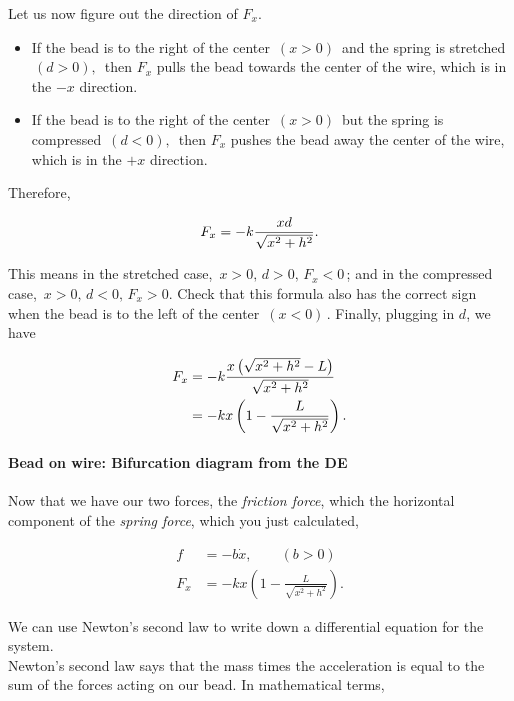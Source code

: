 Let us now figure out the direction of $F_x$.
\begin{itemize}
\item If the bead is to the right of the center $\,(x>0)\,$
  and the spring is stretched $\,(d>0),\,$ then $F_x$ pulls the bead towards the center of the wire,
  which is in the $- x$ direction.
\item If the bead is to the right of the center $\,(x>0)\,$
  but the spring is compressed $\, (d<0),\,$
  then $F_x$ pushes the bead away the center of the wire, which is in the $+ x$ direction.
\end{itemize}

Therefore,

\begin{equation*}
  \displaystyle \displaystyle F_x
  \displaystyle =
  \displaystyle -k\frac{xd}{\sqrt {x^2+h^2}}.
\end{equation*}

This means in the stretched case, $\,x>0,\, d>0,\, F_x < 0\,$;
and in the compressed case, $\,x>0,\, d<0,\, F_x > 0$.
Check that this formula also has the correct sign when the bead is to the left of the center $\,(x<0)\,$.
Finally, plugging in $d$, we have

\begin{align*}
  \displaystyle F_x
  \displaystyle &= \displaystyle - k \frac{x\left(\sqrt {x^2+h^2}-L\right)}{\sqrt {x^2+h^2}} \\
  \displaystyle &= \displaystyle -kx \left(1-\frac{L}{\sqrt {x^2+h^2}}\right).
\end{align*}

\paragraph{Bead on wire: Bifurcation diagram from the DE}
Now that we have our two forces, the \emph{friction force}, which
the horizontal component of the \emph{spring force}, which you just calculated,

\begin{align*}
  f &= -b \dot x, \qquad (b > 0) \\
  F_x &= -kx \left(1-\frac{L}{\sqrt {x^2+h^2}}\right).
\end{align*}

We can use Newton's second law to write down a differential equation for the system. \\
Newton's second law says that the mass times the acceleration
is equal to the sum of the forces acting on our bead.
In mathematical terms,

